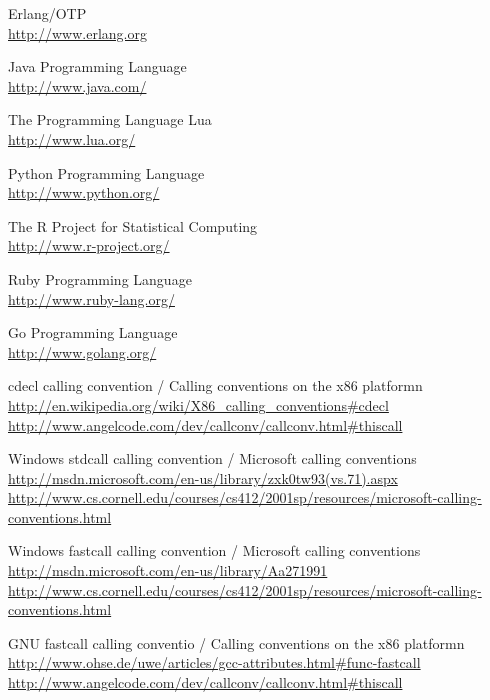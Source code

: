\begin{thebibliography}{99}
	Erlang/OTP\\
	\url{http://www.erlang.org}

	Java Programming Language\\
	\url{http://www.java.com/}

	The Programming Language Lua\\
	\url{http://www.lua.org/}

	Python Programming Language\\
	\url{http://www.python.org/}

	The R Project for Statistical Computing\\
	\url{http://www.r-project.org/}

	Ruby Programming Language\\
	\url{http://www.ruby-lang.org/}

	Go Programming Language\\
	\url{http://www.golang.org/}

	cdecl calling convention / Calling conventions on the x86 platformn\\
	\url{http://en.wikipedia.org/wiki/X86\_calling\_conventions#cdecl}\\
	\url{http://www.angelcode.com/dev/callconv/callconv.html#thiscall}

	Windows stdcall calling convention / Microsoft calling conventions\\
	\url{http://msdn.microsoft.com/en-us/library/zxk0tw93(vs.71).aspx}\\
	\url{http://www.cs.cornell.edu/courses/cs412/2001sp/resources/microsoft-calling-conventions.html}

	Windows fastcall calling convention / Microsoft calling conventions\\
	\url{http://msdn.microsoft.com/en-us/library/Aa271991}\\
	\url{http://www.cs.cornell.edu/courses/cs412/2001sp/resources/microsoft-calling-conventions.html}

	GNU fastcall calling conventio / Calling conventions on the x86 platformn\\
	\url{http://www.ohse.de/uwe/articles/gcc-attributes.html#func-fastcall}\\
	\url{http://www.angelcode.com/dev/callconv/callconv.html#thiscall}


\end{thebibliography}
